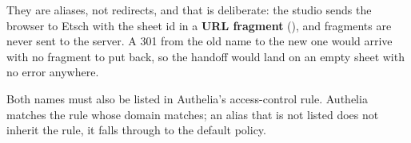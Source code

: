\documentclass[fontpath=fonts/,logopath=logo/]{riposte-doc}
\begin{document}
They are aliases, not redirects, and that is deliberate: the studio sends the browser to Etsch with the sheet id in a \textbf{URL fragment} (), and fragments are never sent to the server. A 301 from the old name to the new one would arrive with no fragment to put back, so the handoff would land on an empty sheet with no error anywhere.

Both names must also be listed in Authelia's access-control rule. Authelia matches the  rule whose domain matches; an alias that is not listed does not inherit the rule, it falls through to the default policy.

\ripend
\end{document}
